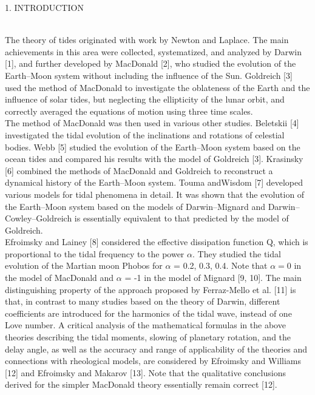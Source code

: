 \documentclass[fontsize = 11pt,a4paper]{article}
\begin{document}
\begin{multicols}{2}

 \centerline{ 1. INTRODUCTION}
~\\
\indent The theory of tides originated with work by Newton
and Laplace. The main achievements in this
area were collected, systematized, and analyzed by
Darwin [1], and further developed by MacDonald [2],
who studied the evolution of the Earth–Moon system
without including the influence of the Sun. Goldreich
[3] used the method of MacDonald to investigate the
oblateness of the Earth and the influence of solar
tides, but neglecting the ellipticity of the lunar orbit,
and correctly averaged the equations of motion using
three time scales.\\
\indent The method of MacDonald was then used in various
other studies. Beletskii [4] investigated the tidal
evolution of the inclinations and rotations of celestial
bodies. Webb [5] studied the evolution of the
Earth–Moon system based on the ocean tides and
compared his results with the model of Goldreich [3].
Krasinsky [6] combined the methods of MacDonald
and Goldreich to reconstruct a dynamical history of
the Earth–Moon system. Touma andWisdom [7] developed
various models for tidal phenomena in detail.
It was shown that the evolution of the Earth–Moon
system based on the models of Darwin–Mignard and
Darwin–Cowley–Goldreich is essentially equivalent
to that predicted by the model of Goldreich.\\
\indent Efroimsky and Lainey [8] considered the effective
dissipation function Q, which is proportional to the
tidal frequency to the power $\alpha$. They studied the tidal
evolution of the Martian moon Phobos for $\alpha$ = 0.2, 0.3, 0.4. Note that $\alpha = 0$ in the model of MacDonald
and $\alpha$ = -1 in the model of Mignard [9, 10]. The
main distinguishing property of the approach proposed
by Ferraz-Mello et al. [11] is that, in contrast to
many studies based on the theory of Darwin, different
coefficients are introduced for the harmonics of the
tidal wave, instead of one Love number. A critical
analysis of the mathematical formulas in the above
theories describing the tidal moments, slowing of
planetary rotation, and the delay angle, as well as the
accuracy and range of applicability of the theories and
connections with rheological models, are considered
by Efroimsky and Williams [12] and Efroimsky and
Makarov [13]. Note that the qualitative conclusions
derived for the simpler MacDonald theory essentially
remain correct [12].\\

\end{multicols}
\end{document}
